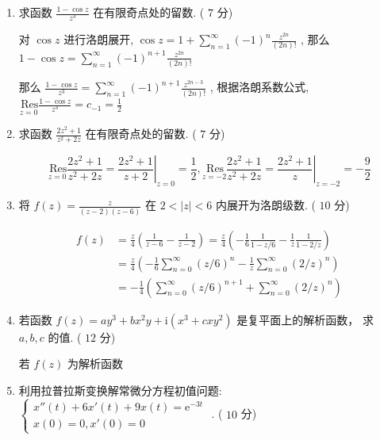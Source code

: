 \documentclass[cn,11pt,fancy,hide]{elegantbook}
\newcommand{\ee}{\mathrm{e}}
\newcommand{\ii}{\mathrm{i}}
\newcommand{\Res}{\,\mathrm{Res}}
\begin{document}
\begin{enumerate}
	\item 求函数 $\frac{1-\cos z}{z^3}$ 在有限奇点处的留数. ( $7$ 分)
	\begin{solution}
		对 $\cos z$ 进行洛朗展开, $\cos z=1+\sum_{n=1}^{\infty}(-1)^n\frac{z^{2n}}{(2n)!}$ , 那么 $1-\cos z=\sum_{n=1}^{\infty}(-1)^{n+1}\frac{z^{2n}}{(2n)!}$
		
		那么 $\frac{1-\cos z}{z^3}=\sum_{n=1}^{\infty}(-1)^{n+1}\frac{z^{2n-3}}{(2n)!}$ , 根据洛朗系数公式, $\underset{z=0}{\Res}\frac{1-\cos z}{z^3}=c_{-1}=\frac{1}{2}$
	\end{solution}
	
	\item 求函数 $\frac{2z^2+1}{z^2+2z}$ 在有限奇点处的留数. ( $7$ 分)
	\begin{solution}
		\begin{equation*}
			\underset{z=0}{\Res}\frac{2z^2+1}{z^2+2z}=\left.\frac{2z^2+1}{z+2} \right|_{z=0}=\frac{1}{2} , 
			\underset{z=-2}{\Res}\frac{2z^2+1}{z^2+2z}=\left.\frac{2z^2+1}{z}\right|_{z=-2}=-\frac{9}{2}
		\end{equation*}
		
	\end{solution}
	
	\item 将 $f(z)=\frac{z}{(z-2)(z-6)}$ 在 $2<|z|<6$ 内展开为洛朗级数. ( $10$ 分)
	\begin{solution}
		\begin{align*}
			f(z)&=\frac{z}{4}\left( \frac{1}{z-6}-\frac{1}{z-2}\right) =\frac{z}{4}\left( -\frac{1}{6}\frac{1}{1-z/6}-\frac{1}{z}\frac{1}{1-2/z}\right) \\
			&=\frac{z}{4}\left( -\frac{1}{6}\sum_{n=0}^{\infty}(z/6)^n-\frac{1}{z}\sum_{n=0}^{\infty}(2/z)^n\right)\\
			&=-\frac{1}{4}\left( \sum_{n=0}^{\infty}(z/6)^{n+1}+\sum_{n=0}^{\infty}(2/z)^n\right)  
		\end{align*}
	\end{solution}
	
	\item 若函数 $f(z)=a y^{3}+b x^{2} y+\ii\left(x^{3}+c x y^{2}\right)$ 是复平面上的解析函数， 求 $a,b,c$ 的值. ( $12$ 分)
	\begin{solution}
		若 $f(z)$ 为解析函数
	\end{solution}
	
	\item 利用拉普拉斯变换解常微分方程初值问题: $\begin{cases}
	x''(t)+6x'(t)+9x(t)=\ee^{-3t}\\
	x(0)=0, x'(0)=0
	\end{cases}$ . ( $10$ 分)
\end{enumerate}
\end{document}
